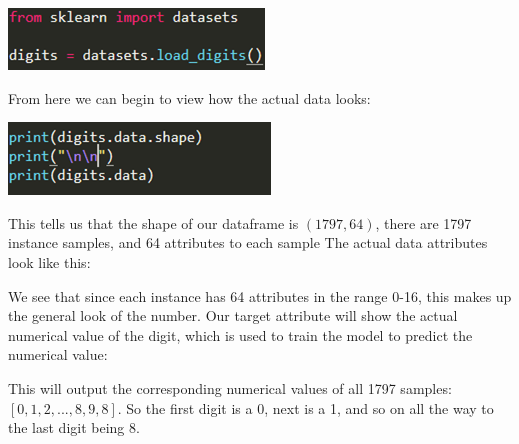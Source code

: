 \documentclass[a4paper,12pt]{report}
\begin{document}
\begin{center}
    \captionsetup{type=figure}
    \includegraphics[width=.9\linewidth]{media/loadDidgit.png}
\end{center}

From here we can  begin to view how the actual data looks:

\begin{center}
    \captionsetup{type=figure}
    \includegraphics[width=.9\linewidth]{media/digitprintpng.png}
\end{center}

This tells us that the shape of our dataframe is $(1797, 64)$, there are 1797 instance samples, and 64 attributes to each sample
The actual data attributes look like this:

\begin{center}
    \captionsetup{type=figure}
\end{center}

We see that since each instance has 64 attributes in the range 0-16, this makes up the general look of the number. Our target attribute will show the actual numerical value of the digit, which is used to train the model to predict the numerical value:

\begin{center}
    \captionsetup{type=figure}
\end{center}

This will output the corresponding numerical values of all 1797 samples: $[0, 1, 2, ..., 8, 9, 8]$. So the first digit is a 0, next is a 1, and so on all the way to the last digit being 8.
\end{document}
